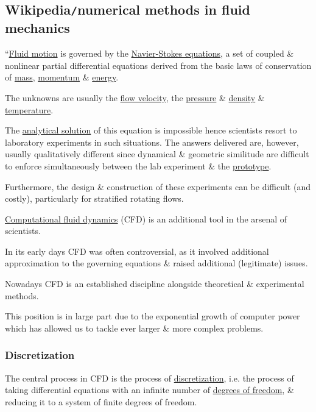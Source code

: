 \documentclass{article}
\begin{document}

\subsection{Wikipedia{\tt/}numerical methods in fluid mechanics}
``\href{https://en.wikipedia.org/wiki/Fluid_motion}{Fluid motion} is governed by the \href{https://en.wikipedia.org/wiki/Navier-Stokes_equations}{Navier-Stokes equations}, a set of coupled \& nonlinear partial differential equations derived from the basic laws of conservation of \href{https://en.wikipedia.org/wiki/Mass}{mass}, \href{https://en.wikipedia.org/wiki/Momentum}{momentum} \& \href{https://en.wikipedia.org/wiki/Energy}{energy}.

The unknowns are usually the \href{https://en.wikipedia.org/wiki/Flow_velocity}{flow velocity}, the \href{https://en.wikipedia.org/wiki/Pressure}{pressure} \& \href{https://en.wikipedia.org/wiki/Density}{density} \& \href{https://en.wikipedia.org/wiki/Temperature}{temperature}.

The \href{https://en.wikipedia.org/wiki/Analytical_solution}{analytical solution} of this equation is impossible hence scientists resort to laboratory experiments in such situations. The answers delivered are, however, usually qualitatively different since dynamical \& geometric similitude are difficult to enforce simultaneously between the lab experiment \& the \href{https://en.wikipedia.org/wiki/Prototype}{prototype}.

Furthermore, the design \& construction of these experiments can be difficult (and costly), particularly for stratified rotating flows.

\href{https://en.wikipedia.org/wiki/Computational_fluid_dynamics}{Computational fluid dynamics} (CFD) is an additional tool in the arsenal of scientists.

In its early days CFD was often controversial, as it involved additional approximation to the governing equations \& raised additional (legitimate) issues.

Nowadays CFD is an established discipline alongside theoretical \& experimental methods.

This position is in large part due to the exponential growth of computer power which has allowed us to tackle ever larger \& more complex problems.

\subsubsection{Discretization}
The central process in CFD is the process of \href{https://en.wikipedia.org/wiki/Discretization}{discretization}, i.e. the process of taking differential equations with an infinite number of \href{https://en.wikipedia.org/wiki/Degrees_of_freedom}{degrees of freedom}, \& reducing it to a system of finite degrees of freedom.
\end{document}
